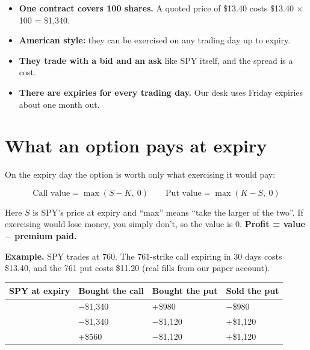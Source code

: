 \documentclass{article}
\begin{document}
\begin{itemize}

\item \textbf{One contract covers 100 shares.} A quoted price of \$13.40 costs \$13.40 \ensuremath{\times} 100 = \$1,340.

\item \textbf{American style:} they can be exercised on any trading day up to expiry.

\item \textbf{They trade with a bid and an ask} like SPY itself, and the spread is a cost.

\item \textbf{There are expiries for every trading day.} Our desk uses Friday expiries about one month out.

\end{itemize}

\section{What an option pays at expiry}

On the expiry day the option is worth only what exercising it would pay:

\[\text{Call value} = \max(S - K,\ 0) \qquad \text{Put value} = \max(K - S,\ 0)\]

Here $S$ is SPY's price at expiry and ``max'' means ``take the larger of the two''. If exercising would lose money, you simply don't, so the value is 0. \textbf{Profit = value \ensuremath{-} premium paid.}

\textbf{Example.} SPY trades at 760. The 761-strike call expiring in 30 days costs \$13.40, and the 761 put costs \$11.20 (real fills from our paper account).

\begin{center}\small
\begin{tabularx}{\linewidth}{>{\raggedright\arraybackslash}X >{\raggedright\arraybackslash}X >{\raggedright\arraybackslash}X l}
\toprule
\textbf{SPY at expiry} & \textbf{Bought the call} & \textbf{Bought the put} & \textbf{Sold the put} \\
\midrule
740 & \ensuremath{-}\$1,340 & +\$980 & \ensuremath{-}\$980 \\
761 & \ensuremath{-}\$1,340 & \ensuremath{-}\$1,120 & +\$1,120 \\
780 & +\$560 & \ensuremath{-}\$1,120 & +\$1,120 \\
\bottomrule
\end{tabularx}
\end{center}
\end{document}
